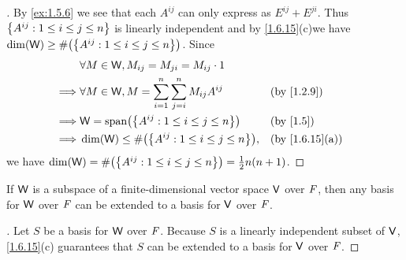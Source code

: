 \begin{proof}[]
  By \cref{ex:1.5.6} we see that each \(A^{i j}\) can only express as \(E^{i j} + E^{j i}\).
  Thus \(\left\lbrace A^{i j} : 1 \leq i \leq j \leq n\right\rbrace\) is linearly independent and by \cref{1.6.15}(c)we have  \(\dim(\W) \geq \#\pa{\set{A^{i j} : 1 \leq i \leq j \leq n}}\).
  Since
  \begin{align*}
             & \forall M \in \W, M_{i j} = M_{j i} = M_{i j} \cdot 1                                                 \\
    \implies & \forall M \in \W, M = \sum_{i = 1}^n \sum_{j = i}^n M_{i j} A^{i j} &  & \text{(by \cref{1.2.9})}     \\
    \implies & \W = \spn{\set{A^{i j} : 1 \leq i \leq j \leq n}}                   &  & \text{(by \cref{1.5})}       \\
    \implies & \dim(\W) \leq \#\pa{\set{A^{i j} : 1 \leq i \leq j \leq n}},        &  & \text{(by \cref{1.6.15}(a))}
  \end{align*}
  we have \(\dim(\W) = \#\pa{\set{A^{i j} : 1 \leq i \leq j \leq n}} = \frac{1}{2} n(n + 1)\).
\end{proof}

\begin{cor}\label{1.6.19}
  If \(\mathsf{W}\) is a subspace of a finite-dimensional vector space \(\mathsf{V}\) over \(\mathit{F}\), then any basis for \(\mathsf{W}\) over \(\mathit{F}\) can be extended to a basis for \(\mathsf{V}\) over \(\mathit{F}\).
\end{cor}

\begin{proof}[]
  Let \(S\) be a basis for \(\mathsf{W}\) over \(\mathit{F}\).
  Because \(S\) is a linearly independent subset of \(\mathsf{V}\), \cref{1.6.15}(c) guarantees that \(S\) can be extended to a basis for \(\mathsf{V}\) over \(\mathit{F}\).
\end{proof}

